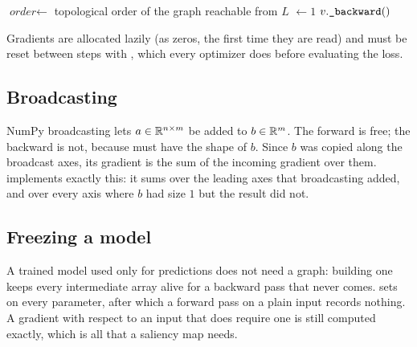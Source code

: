 \begin{algorithm}[H]
\caption{ (reverse mode)}
\begin{algorithmic}[1]
\State $\textit{order} \gets$ topological order of the graph reachable from $L$
\State {} $\gets 1$
  \State $v.\texttt{\_backward}()$ 
\EndFor
\end{algorithmic}
\end{algorithm}

Gradients are allocated lazily (as zeros, the first time they are read) and must be reset between
steps with , which every optimizer does before evaluating the loss.

\subsection{Broadcasting}
NumPy broadcasting lets $a \in \mathbb{R}^{n\times m}$ be added to $b \in \mathbb{R}^{m}$. The forward is free; the
backward is not, because  must have the shape of $b$. Since $b$ was copied along the
broadcast axes, its gradient is the sum of the incoming gradient over them. 
implements exactly this: it sums over the leading axes that broadcasting added, and over every axis
where $b$ had size $1$ but the result did not.

\subsection{Freezing a model}
A trained model used only for predictions does not need a graph: building one keeps every
intermediate array alive for a backward pass that never comes.  sets
 on every parameter, after which a forward pass on a plain input
records nothing. A gradient with respect to an input that does require one is still computed
exactly, which is all that a saliency map needs.

